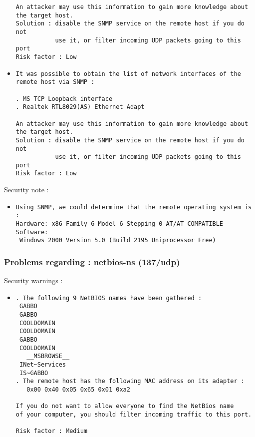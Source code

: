 \documentclass{article}
\begin{document}
\begin{itemize}
\begin{verbatim}
An attacker may use this information to gain more knowledge about
the target host.
Solution : disable the SNMP service on the remote host if you do not
           use it, or filter incoming UDP packets going to this port
Risk factor : Low
\end{verbatim}\item \begin{verbatim}
It was possible to obtain the list of network interfaces of the
remote host via SNMP : 

. MS TCP Loopback interface
. Realtek RTL8029(AS) Ethernet Adapt

An attacker may use this information to gain more knowledge about
the target host.
Solution : disable the SNMP service on the remote host if you do not
           use it, or filter incoming UDP packets going to this port
Risk factor : Low
\end{verbatim}\end{itemize}
Security note :\\
\begin{itemize}
\item \begin{verbatim}
Using SNMP, we could determine that the remote operating system is :
Hardware: x86 Family 6 Model 6 Stepping 0 AT/AT COMPATIBLE - Software:
 Windows 2000 Version 5.0 (Build 2195 Uniprocessor Free)
\end{verbatim}\end{itemize}
\subsubsection{Problems regarding : netbios-ns (137/udp)}
Security warnings :\\
\begin{itemize}
\item \begin{verbatim}
. The following 9 NetBIOS names have been gathered :
 GABBO          
 GABBO          
 COOLDOMAIN     
 COOLDOMAIN     
 GABBO          
 COOLDOMAIN     
   __MSBROWSE__ 
 INet~Services  
 IS~GABBO       
. The remote host has the following MAC address on its adapter :
   0x00 0x40 0x05 0x65 0x01 0xa2 

If you do not want to allow everyone to find the NetBios name
of your computer, you should filter incoming traffic to this port.

Risk factor : Medium
\end{verbatim}\end{itemize}
\end{document}
